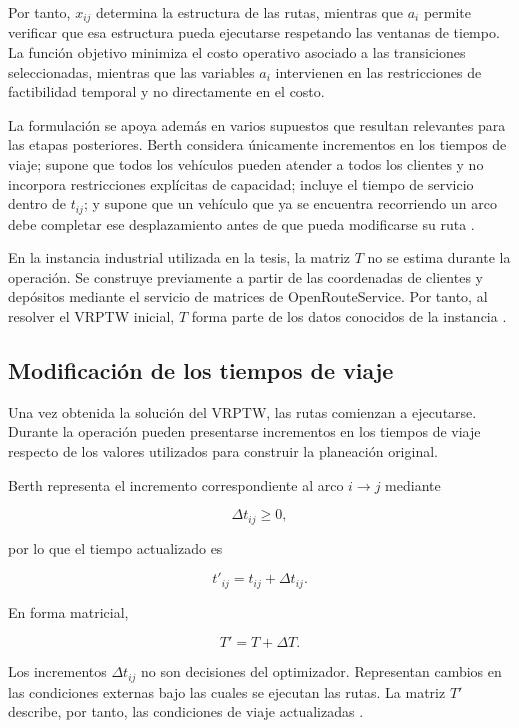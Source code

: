 \documentclass[11pt]{article}
\begin{document}
Por tanto, \(x_{ij}\) determina la estructura de las rutas, mientras que \(a_i\)
permite verificar que esa estructura pueda ejecutarse respetando las ventanas de
tiempo. La función objetivo minimiza el costo operativo asociado a las transiciones
seleccionadas, mientras que las variables \(a_i\) intervienen en las restricciones de
factibilidad temporal y no directamente en el costo.

La formulación se apoya además en varios supuestos que resultan relevantes para las
etapas posteriores. Berth considera únicamente incrementos en los tiempos de viaje;
supone que todos los vehículos pueden atender a todos los clientes y no incorpora
restricciones explícitas de capacidad; incluye el tiempo de servicio dentro de
\(t_{ij}\); y supone que un vehículo que ya se encuentra recorriendo un arco debe
completar ese desplazamiento antes de que pueda modificarse su ruta
\parencite{berth_thesis_2025}.

En la instancia industrial utilizada en la tesis, la matriz \(T\) no se estima durante
la operación. Se construye previamente a partir de las coordenadas de clientes y
depósitos mediante el servicio de matrices de OpenRouteService. Por tanto, al
resolver el VRPTW inicial, \(T\) forma parte de los datos conocidos de la instancia
\parencite{berth_thesis_2025}.

\subsection{Modificación de los tiempos de viaje}

Una vez obtenida la solución del VRPTW, las rutas comienzan a ejecutarse. Durante
la operación pueden presentarse incrementos en los tiempos de viaje respecto de los
valores utilizados para construir la planeación original.

Berth representa el incremento correspondiente al arco \(i\rightarrow j\) mediante

\[
\Delta t_{ij}\geq 0,
\]

por lo que el tiempo actualizado es

\[
t'_{ij}=t_{ij}+\Delta t_{ij}.
\]

En forma matricial,

\[
T'=T+\Delta T.
\]

Los incrementos \(\Delta t_{ij}\) no son decisiones del optimizador. Representan
cambios en las condiciones externas bajo las cuales se ejecutan las rutas. La matriz
\(T'\) describe, por tanto, las condiciones de viaje actualizadas
\parencite{berth_thesis_2025}.
\end{document}
